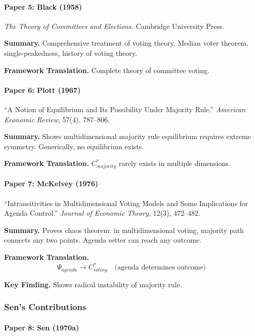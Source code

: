 \paragraph{Paper 5: Black (1958)}

\textit{The Theory of Committees and Elections.}
Cambridge University Press.

\textbf{Summary.}
Comprehensive treatment of voting theory. Median voter theorem, 
single-peakedness, history of voting theory.

\textbf{Framework Translation.}
Complete theory of committee voting.

\paragraph{Paper 6: Plott (1967)}

``A Notion of Equilibrium and Its Possibility Under Majority Rule.''
\textit{American Economic Review}, 57(4), 787--806.

\textbf{Summary.}
Shows multidimensional majority rule equilibrium requires extreme symmetry.
Generically, no equilibrium exists.

\textbf{Framework Translation.}
$C^*_{majority}$ rarely exists in multiple dimensions.

\paragraph{Paper 7: McKelvey (1976)}

``Intransitivities in Multidimensional Voting Models and Some Implications 
for Agenda Control.''
\textit{Journal of Economic Theory}, 12(3), 472--482.

\textbf{Summary.}
Proves chaos theorem: in multidimensional voting, majority path connects 
any two points. Agenda setter can reach any outcome.

\textbf{Framework Translation.}
\begin{equation}
\Psi_{agenda} \to C^*_{voting} \quad \text{(agenda determines outcome)}
\end{equation}

\textbf{Key Finding.}
Shows radical instability of majority rule.

\subsubsection{Sen's Contributions}

\paragraph{Paper 8: Sen (1970a)}

